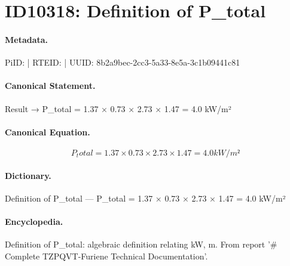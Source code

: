 \section*{ID10318: Definition of P\_total}
\paragraph{Metadata.}
PiID:  | RTEID:  | UUID: 8b2a9bec-2cc3-5a33-8e5a-3c1b09441c81

\paragraph{Canonical Statement.}
Result → P\_total = 1.37 × 0.73 × 2.73 × 1.47 = 4.0 kW/m²

\paragraph{Canonical Equation.}
\[
P_total = 1.37 × 0.73 × 2.73 × 1.47 = 4.0 kW/m²
\]

\paragraph{Dictionary.}
Definition of P\_total — P\_total = 1.37 × 0.73 × 2.73 × 1.47 = 4.0 kW/m²

\paragraph{Encyclopedia.}
Definition of P\_total: algebraic definition relating kW, m. From report '\# Complete TZPQVT-Furiene Technical Documentation'.
